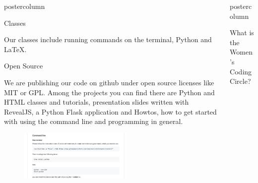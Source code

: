 \documentclass{beamer}
\newlength{\columnheight}
\begin{document}
\begin{frame}
\begin{columns}
\begin{column}{.33\textwidth}
\begin{beamercolorbox}[center,wd=\textwidth]{postercolumn}
\begin{minipage}[T]{.95\textwidth}
{\begin{myblock}{Classes}
\begin{addmargin}[1em]{1em}
                            Our classes include running commands on the terminal, Python and \LaTeX.
                        \end{addmargin}
                    \end{myblock}\vfill
                    \vspace{1.25cm}
					\begin{myblock}{Open Source}
					    \begin{addmargin}[1em]{1em}
                            We are publishing our code on github under open source licenses like MIT or GPL.
                            Among the projects you can find there are Python and HTML classes and tutorials, presentation slides written with RevealJS,
                            a Python Flask application and Howtos, how to get started with using the command line and programming in general.
                        \end{addmargin}
                        \begin{addmargin}[1em]{1em}
                            \begin{figure}
                                \vspace{1cm}
                                \centering\includegraphics[width=0.59\textwidth]{img/cmd.png}
                                \vspace{1cm}
                            \end{figure}
                        \end{addmargin}
                    \end{myblock}\vfill
		}\end{minipage}\end{beamercolorbox}
	\end{column}
  \begin{column}{.33\textwidth}
		\begin{beamercolorbox}[center,wd=\textwidth]{postercolumn}
			\begin{minipage}[T]{.95\textwidth}
				\parbox[t][\columnheight]{\textwidth}{
					\begin{myblock}{What is the Women's Coding Circle?}
                        \begin{addmargin}[1em]{1em}

\end{addmargin}
\end{myblock}}
\end{minipage}
\end{beamercolorbox}
\end{column}
\end{columns}
\end{frame}
\end{document}
